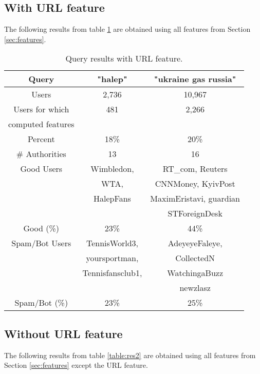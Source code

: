 \subsection{With URL feature}

The following results from table \ref{table:res1} are obtained using all features from Section \ref{sec:features}.

\begin{table}[!h]
\centering
\setlength{\tabcolsep}{12pt}
\begin{tabular}{| c | c | c |}
\hline
Query & "halep" & "ukraine gas russia" \\
\hline
Users & 2,736 & 10,967 \\
\hline
Users for which & 481 & 2,266 \\
computed features & & \\
\hline
Percent & 18\% & 20\% \\
\hline
\# Authorities & 13 & 16\\
\hline
Good Users & Wimbledon,    		  & RT\_com, Reuters \\
		   & WTA,                 & CNNMoney, KyivPost \\
           & HalepFans            & MaximEristavi, guardian \\
           &					  & STForeignDesk \\
\hline
Good (\%) & 23\% & 44\% \\
\hline
Spam/Bot Users & TennisWorld3, 					& AdeyeyeFaleye, \\
               & yoursportman,					& CollectedN\\
               & Tennisfansclub1,		   		& WatchingaBuzz \\
               &								& newzlasz \\


\hline
Spam/Bot (\%) & 23\% & 25\% \\
\hline
\end{tabular}
\caption{Query results with URL feature.}
\label{table:res1}
\end{table}

\subsection{Without URL feature}

The following results from table \ref{table:res2} are obtained using all features from Section \ref{sec:features} except the URL feature.

